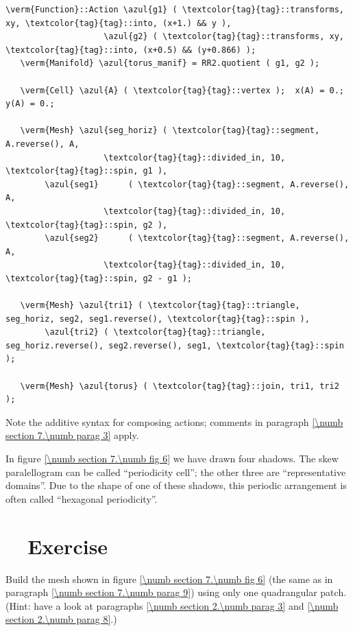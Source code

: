 \begin{Verbatim}[commandchars=\\\{\},formatcom=\small\tt,frame=single,
   label=parag-\ref{\numb section 7.\numb parag 9}.cpp,rulecolor=\color{coment},
   baselinestretch=0.94,framesep=2mm                                            ]
   \verm{Function}::Action \azul{g1} ( \textcolor{tag}{tag}::transforms, xy, \textcolor{tag}{tag}::into, (x+1.) && y ),
                    \azul{g2} ( \textcolor{tag}{tag}::transforms, xy, \textcolor{tag}{tag}::into, (x+0.5) && (y+0.866) );
   \verm{Manifold} \azul{torus_manif} = RR2.quotient ( g1, g2 );

   \verm{Cell} \azul{A} ( \textcolor{tag}{tag}::vertex );  x(A) = 0.;  y(A) = 0.;

   \verm{Mesh} \azul{seg_horiz} ( \textcolor{tag}{tag}::segment, A.reverse(), A,
                    \textcolor{tag}{tag}::divided_in, 10, \textcolor{tag}{tag}::spin, g1 ),
        \azul{seg1}      ( \textcolor{tag}{tag}::segment, A.reverse(), A,
                    \textcolor{tag}{tag}::divided_in, 10, \textcolor{tag}{tag}::spin, g2 ),
        \azul{seg2}      ( \textcolor{tag}{tag}::segment, A.reverse(), A,
                    \textcolor{tag}{tag}::divided_in, 10, \textcolor{tag}{tag}::spin, g2 - g1 );

   \verm{Mesh} \azul{tri1} ( \textcolor{tag}{tag}::triangle, seg_horiz, seg2, seg1.reverse(), \textcolor{tag}{tag}::spin ),
        \azul{tri2} ( \textcolor{tag}{tag}::triangle, seg_horiz.reverse(), seg2.reverse(), seg1, \textcolor{tag}{tag}::spin );
   
   \verm{Mesh} \azul{torus} ( \textcolor{tag}{tag}::join, tri1, tri2 );
\end{Verbatim}

Note the additive syntax for composing actions; comments in paragraph
\ref{\numb section 7.\numb parag 3} apply.

In figure \ref{\numb section 7.\numb fig 6} we have drawn four shadows.
The skew paralellogram can be called ``periodicity cell'';
the other three are ``representative domains''.
Due to the shape of one of these shadows, this periodic arrangement is often called
``hexagonal periodicity''.


\section{~~Exercise}\label{\numb section 7.\numb parag 10}

Build the mesh shown in figure \ref{\numb section 7.\numb fig 6}
(the same as in paragraph \ref{\numb section 7.\numb parag 9}) using only one quadrangular patch.
(Hint: have a look at paragraphs \ref{\numb section 2.\numb parag 3} and
\ref{\numb section 2.\numb parag 8}.)


